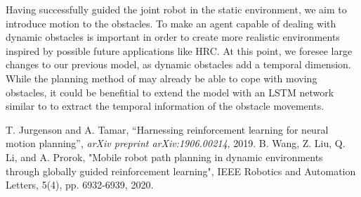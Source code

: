 \documentclass[conference]{IEEEtran}
\begin{document}
Having successfully guided the joint robot in the static environment, we aim to introduce motion to the obstacles. To make an agent capable of dealing with dynamic obstacles is important in order to create more realistic environments inspired by possible future applications like HRC. At this point, we foresee large changes to our previous model, as dynamic obstacles add a temporal dimension. While the planning method of \cite{b1} may already be able to cope with moving obstacles, it could be benefitial to extend the model with an LSTM network similar to \cite{b2} to extract the temporal information of the obstacle movements. 

\begin{thebibliography}{00}
 T. Jurgenson and A. Tamar, ``Harnessing reinforcement learning for neural
motion planning'',  \textit{arXiv preprint arXiv:1906.00214}, 2019.
 B. Wang, Z. Liu, Q. Li, and A. Prorok, "Mobile robot path planning in dynamic environments through globally guided reinforcement learning",  IEEE Robotics and Automation Letters, 5(4), pp. 6932-6939, 2020.
\end{thebibliography}
\end{document}

